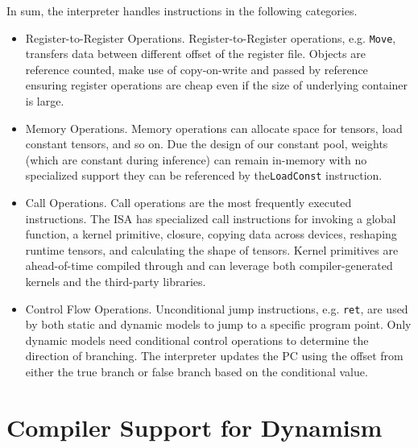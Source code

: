 In sum, the interpreter handles instructions in the following categories.

\begin{itemize}
    \item Register-to-Register Operations. Register-to-Register operations, e.g. \texttt{Move}, transfers data between different offset of the register file. Objects are reference counted, make use of copy-on-write and passed by reference ensuring register operations are cheap even if the size of underlying container is large.

    \item Memory Operations. Memory operations can allocate space for tensors, load constant tensors, and so on. Due the design of our constant pool, weights (which are constant during inference) can remain in-memory with no specialized support they can be referenced by the\texttt{LoadConst} instruction.

    \item Call Operations. Call operations are the most frequently executed instructions. The ISA
    has specialized call instructions for invoking a global function, a kernel primitive, closure, copying data across devices, reshaping runtime tensors, and calculating the shape of tensors. Kernel primitives are ahead-of-time compiled through and can leverage both compiler-generated kernels and the third-party libraries.

    \item Control Flow Operations. Unconditional jump instructions, e.g. \texttt{ret}, are used by both static and dynamic models to jump to a specific program point. Only dynamic models need conditional control operations to determine the direction of branching. The interpreter updates the PC using the offset from either the true branch or false branch based on the conditional value.
\end{itemize}



\section{Compiler Support for Dynamism}
\label{sec:compliation}

